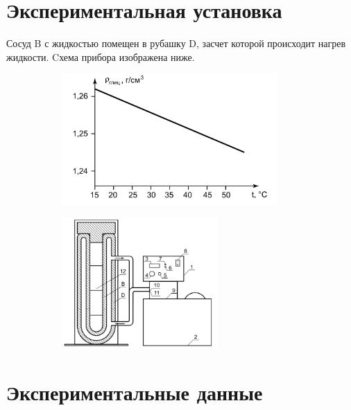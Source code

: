 \section*{Экспериментальная установка}
\indent
Сосуд B с жидкостью помещен в рубашку D, засчет которой происходит нагрев 
жидкости. Cхема прибора изображена ниже. 
\begin{figure}[h!]
    \centering
    \begin{subfigure}{0.45\textwidth}
        \includegraphics[height=5cm]{fluid2.png}
    \end{subfigure}
\hfill
    \begin{subfigure}{0.45\textwidth}
        \includegraphics[height=5cm]{setup.png}
    \end{subfigure}
\end{figure}

\newpage

\section*{Экспериментальные данные}


